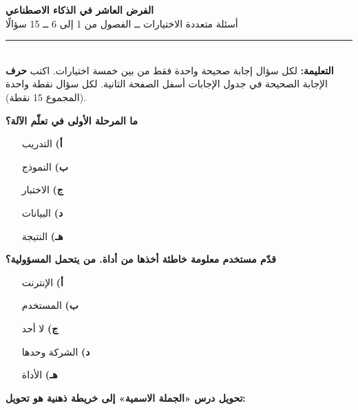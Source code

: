 \documentclass[11pt,a4paper]{article}
\begin{document}
\begin{center}
{\Large\khatt\textbf{الفرض العاشر في الذكاء الاصطناعي}}\\[2pt]
{\normalsize أسئلة متعددة الاختيارات ــ الفصول من 1 إلى 6 ــ 15 سؤالًا}
\end{center}
\vspace{-4pt}\rule{\textwidth}{0.6pt}\\
{\small\textbf{التعليمة:} لكل سؤال إجابة صحيحة واحدة فقط من بين خمسة اختيارات.
اكتب \textbf{حرف} الإجابة الصحيحة في جدول الإجابات أسفل الصفحة الثانية.
لكل سؤال نقطة واحدة (المجموع 15 نقطة).}
\vspace{-2pt}
\begin{multicols}{2}

\noindent\begin{minipage}{\linewidth}
\hangindent=0.7cm\textbf{ما المرحلة الأولى في تعلّم الآلة؟}
\begin{itemize}[leftmargin=0.95cm, labelsep=4pt, itemsep=0pt, topsep=2pt, parsep=0pt]
  \item[\textbf{أ)}] التدريب
  \item[\textbf{ب)}] النموذج
  \item[\textbf{ج)}] الاختبار
  \item[\textbf{د)}] البيانات
  \item[\textbf{هـ)}] النتيجة
\end{itemize}
\end{minipage}\par\vspace{7pt plus 4pt}
\noindent\begin{minipage}{\linewidth}
\hangindent=0.7cm\textbf{قدّم مستخدم معلومة خاطئة أخذها من أداة. من يتحمل المسؤولية؟}
\begin{itemize}[leftmargin=0.95cm, labelsep=4pt, itemsep=0pt, topsep=2pt, parsep=0pt]
  \item[\textbf{أ)}] الإنترنت
  \item[\textbf{ب)}] المستخدم
  \item[\textbf{ج)}] لا أحد
  \item[\textbf{د)}] الشركة وحدها
  \item[\textbf{هـ)}] الأداة
\end{itemize}
\end{minipage}\par\vspace{7pt plus 4pt}
\noindent\begin{minipage}{\linewidth}
\hangindent=0.7cm\textbf{تحويل درس «الجملة الاسمية» إلى خريطة ذهنية هو تحويل:}

\end{minipage}
\end{multicols}
\end{document}
